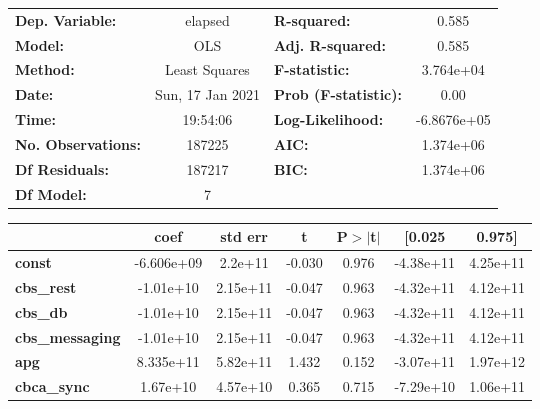 \documentclass{report}
\begin{document}
\begin{center}
\begin{tabular}{lclc}
\toprule
\textbf{Dep. Variable:}    &     elapsed      & \textbf{  R-squared:         } &      0.585   \\
\textbf{Model:}            &       OLS        & \textbf{  Adj. R-squared:    } &      0.585   \\
\textbf{Method:}           &  Least Squares   & \textbf{  F-statistic:       } &  3.764e+04   \\
\textbf{Date:}             & Sun, 17 Jan 2021 & \textbf{  Prob (F-statistic):} &      0.00    \\
\textbf{Time:}             &     19:54:06     & \textbf{  Log-Likelihood:    } & -6.8676e+05  \\
\textbf{No. Observations:} &      187225      & \textbf{  AIC:               } &  1.374e+06   \\
\textbf{Df Residuals:}     &      187217      & \textbf{  BIC:               } &  1.374e+06   \\
\textbf{Df Model:}         &           7      & \textbf{                     } &              \\
\bottomrule
\end{tabular}
\begin{tabular}{lcccccc}
                           & \textbf{coef} & \textbf{std err} & \textbf{t} & \textbf{P$> |$t$|$} & \textbf{[0.025} & \textbf{0.975]}  \\
\midrule
\textbf{const}             &   -6.606e+09  &      2.2e+11     &    -0.030  &         0.976        &    -4.38e+11    &     4.25e+11     \\
\textbf{cbs\_rest}         &    -1.01e+10  &     2.15e+11     &    -0.047  &         0.963        &    -4.32e+11    &     4.12e+11     \\
\textbf{cbs\_db}           &    -1.01e+10  &     2.15e+11     &    -0.047  &         0.963        &    -4.32e+11    &     4.12e+11     \\
\textbf{cbs\_messaging}    &    -1.01e+10  &     2.15e+11     &    -0.047  &         0.963        &    -4.32e+11    &     4.12e+11     \\
\textbf{apg}               &    8.335e+11  &     5.82e+11     &     1.432  &         0.152        &    -3.07e+11    &     1.97e+12     \\
\textbf{cbca\_sync}        &     1.67e+10  &     4.57e+10     &     0.365  &         0.715        &    -7.29e+10    &     1.06e+11     \\

\end{tabular}
\end{center}
\end{document}
